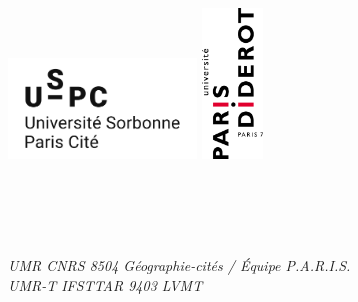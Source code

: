 \begin{titlepage}


\begin{addmargin}[-1cm]{-3cm}
\begin{center}
\large

\hfill


\vspace{-2cm}
\includegraphics[width=5cm]{Figures/Art/logouspc.png}
\hfill
\includegraphics[height=4cm]{Figures/Art/Logo-P7.png}

\vspace{0.5cm}

\begingroup
{}\\\medskip
{}\\\medskip
{}\\\medskip
{}\\\vspace{0.5cm}
\textit{UMR CNRS 8504 Géographie-cités / Équipe P.A.R.I.S.}\\
\textit{UMR-T IFSTTAR 9403 LVMT}
\endgroup



\vspace{1.5cm}

\begingroup
\textbf{\spacedallcaps{\myTitle}} \\ \bigskip %
\endgroup

\vspace{1.5cm}





\end{center}
\end{addmargin}
\end{titlepage}
